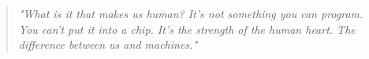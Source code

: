 \begin{quotation} %
\emph{
"What is it that makes us human? It's not something you can
program. You can't put it into a chip. It's the strength of the human
heart. The difference between us and machines."}


\end{quotation}
